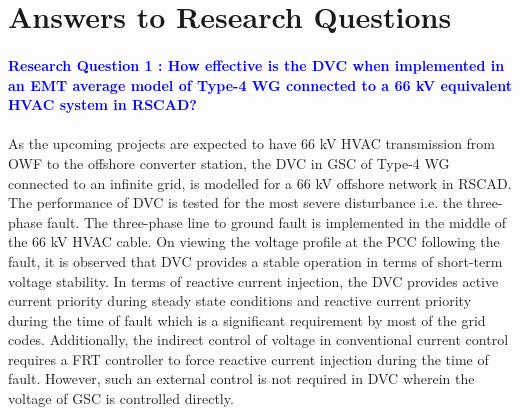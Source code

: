 



\section{Answers to Research Questions}
\vspace{2mm}
\paragraph{\textcolor{blue}{Research Question 1 : How effective is the \gls{DVC} when implemented in an \gls{EMT} average model of Type-4 \gls{WG} connected to a 66 kV equivalent \gls{HVAC} system in RSCAD?}}

\paragraph{} As the upcoming projects are expected to have 66 kV \gls{HVAC} transmission from \gls{OWF} to the offshore converter station, the \gls{DVC} in \gls{GSC} of Type-4 \gls{WG} connected to an infinite grid, is modelled for a 66 kV offshore network in RSCAD. The performance of \gls{DVC} is tested for the most severe disturbance i.e. the three-phase fault. The three-phase line to ground fault is implemented in the middle of the 66 kV \gls{HVAC} cable. On viewing the voltage profile at the \gls{PCC} following the fault, it is observed that \gls{DVC} provides a stable operation in terms of short-term voltage stability. In terms of reactive current injection, the \gls{DVC} provides active current priority during steady state conditions and reactive current priority during the time of fault which is a significant requirement by most of the grid codes. Additionally, the indirect control of voltage in conventional current control requires a FRT controller to force reactive current injection during the time of fault. However, such an external control is not required in \gls{DVC} wherein the voltage of \gls{GSC} is controlled directly. 

